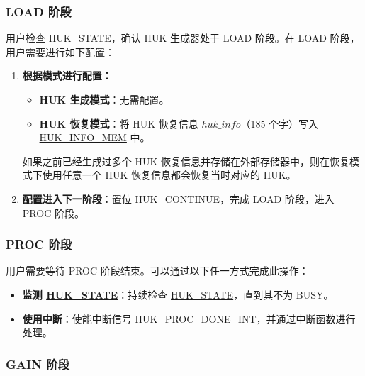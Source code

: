 \documentclass[main\_\_CN.tex]{subfiles}
\begin{document}
\subsubsection{LOAD 阶段}

用户检查 \hyperref[fielddesc:HUKSTATE]{HUK\_STATE}，确认 HUK 生成器处于 LOAD 阶段。在 LOAD 阶段，用户需要进行如下配置：
\begin{enumerate}
    \item \textbf{根据模式进行配置：}
    \begin{itemize}
        \item \textbf{HUK 生成模式}：无需配置。
        \item \textbf{HUK 恢复模式}：将 HUK 恢复信息 \hyperref[para:hukinfo]{\begin{math}huk\_info\end{math}}（185 个字）写入 \hyperref[mem:huk-info]{HUK\_INFO\_MEM} 中。
    \end{itemize}
    \vspace{-0.5em}
    \newpage
    \begin{tiplisting}
    如果之前已经生成过多个 HUK 恢复信息并存储在外部存储器中，则在恢复模式下使用任意一个 HUK 恢复信息都会恢复当时对应的 HUK。
    \end{tiplisting}
    \item \textbf{配置进入下一阶段}：置位 \hyperref[fielddesc:HUKCONTINUE]{HUK\_CONTINUE}，完成 LOAD 阶段，进入 PROC 阶段。
\end{enumerate}

\subsubsection{PROC 阶段}

用户需要等待 PROC 阶段结束。可以通过以下任一方式完成此操作：
\begin{itemize}
    \item \textbf{监测 \hyperref[fielddesc:HUKSTATE]{HUK\_STATE}}：持续检查 \hyperref[fielddesc:HUKSTATE]{HUK\_STATE}，直到其不为 BUSY。
    \item \textbf{使用中断}：使能中断信号 \hyperref[int:HUKPROCDONEINT]{HUK\_PROC\_DONE\_INT}，并通过中断函数进行处理。
\end{itemize}

\subsubsection{GAIN 阶段}
\end{document}
